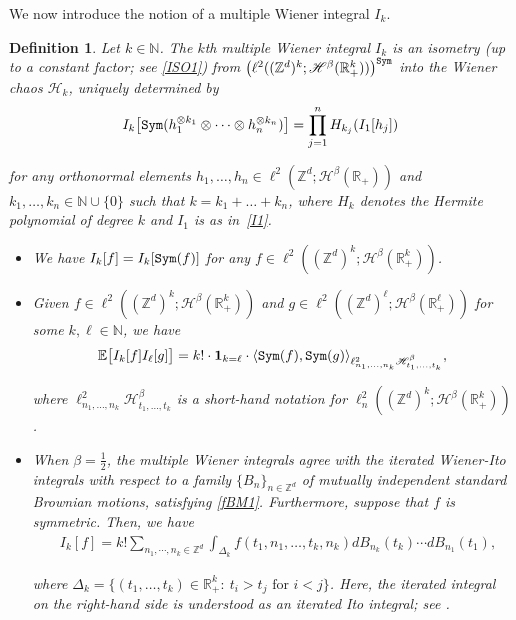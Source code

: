 \documentclass[letterpaper, 11pt,  reqno]{amsart}
\newtheorem{definition}[theorem]{Definition}
\DeclareMathOperator*{\intt}{\int}
\newcommand{\1}{\hspace{0.5mm}\textup{I}\hspace{0.5mm}}
\newcommand{\noi}{\noindent}
\newcommand{\Z}{\mathbb{Z}}
\newcommand{\R}{\mathbb{R}}
\newcommand{\E}{\mathbb{E}}
\newcommand{\be}{\beta}
\newcommand{\Dl}{\Delta}
\renewcommand{\l}{\ell}
\newcommand{\jb}[1]
{\langle #1 \rangle}
\newcommand{\ind}{\mathbf 1}
\newcommand{\N}{\mathbb{N}}
\newcommand{\Hs}{\mathscr{H}}
\newcommand{\HH}{\mathcal{H}}
\newcommand{\Sym}{\textup{\texttt{Sym}}}
\numberwithin{equation}{section}
\numberwithin{theorem}{section}
\begin{document}
We now introduce 
 the notion of a multiple Wiener integral $I_k$.

\begin{definition} \rm
Let $k\in\N$.
The $k$th multiple Wiener integral $I_k$ is an isometry
(up to a constant factor; see \eqref{ISO1}) from 
$\big(\l^2( (\Z^d)^{k} ; \Hs^\be(\R_+^{k}))  \big)^\Sym$
into the Wiener chaos $\HH_k$, uniquely determined by
\begin{align*}
I_k\big[ \Sym(h_1^{\otimes k_1} \otimes \cdots \otimes h_n^{\otimes k_n})
\big  ] = \prod_{j=1}^n H_{k_j} (I_1[h_j])
\end{align*}

\noi
for any orthonormal elements $h_1, \ldots, h_n \in 
\l^2(\Z^d;\Hs^\be(\R_+))$ and  $k_1, \dots, k_n \in \N\cup\{0\}$
such that  $k = k_1 + \ldots + k_n$, 
where $H_{k}$ denotes the  Hermite polynomial of degree $k$ and $I_1$ is as in~\eqref{I1}.


\smallskip

\begin{itemize}
\item
We have 
$I_k[f] = I_k [ \Sym(f)]$
for any $f\in
\l^2( (\Z^d)^{k} ; \Hs^\be(\R_+^{k})  )$. 


\smallskip
\item
Given $f\in
\l^2( (\Z^d)^{k} ; \Hs^\be(\R_+^{k})  )$
 and $g\in \l^2( (\Z^d)^\l ; \Hs^\be(\R_+^{\l})  )$
for some $k, \l \in \N$, we have
\begin{align}
\E \big[ I_k[f] I_\l[g] \big] = k! \cdot \ind_{k=\l} \cdot \jb{\Sym(f), \Sym(g)}_{\l^2_{n_1, \dots, n_k} \Hs^\be_{t_1, \dots, t_k}}, 
\label{ISO1}
\end{align}

\noi
where
$\l^2_{n_1, \dots, n_k} \Hs^\be_{t_1, \dots, t_k}$
is a short-hand notation for 
$\l^2_{n}( (\Z^d)^{k} ; \Hs^\be(\R_+^{k})  )$.

\smallskip
\item
When $\be=\frac{1}{2}$, the multiple Wiener integrals agree with the iterated Wiener-Ito integrals with respect to 
a family  $\{B_n \}_{n \in \Z^d}$ of mutually independent standard Brownian motions, 
satisfying \eqref{fBM1}.
Furthermore, suppose that $f$ is symmetric.
Then, we have 
\begin{align*}
& I_k[f] 
 = k! \sum_{n_1, \cdots, n_k \in \Z^d} 
\intt_{\Dl_k}
f(t_1, n_1, \dots, t_k, n_k)
 dB_{n_k}(t_k) \cdots dB_{n_1}(t_1),
\end{align*}

\noi
where 
$\Dl_k
= \big\{ (t_1, \ldots, t_k) \in \R_+^k: \ t_i > t_j 
\text{ for } i < j\big\}$.
Here,  the iterated integral on the right-hand side is understood as an iterated 
Ito integral; see \cite[p.\,23]{Nualart06}.


\end{itemize}




\end{definition}
\end{document}
